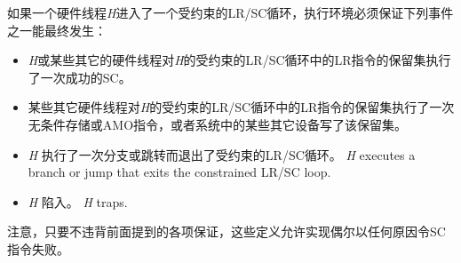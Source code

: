 如果一个硬件线程{\em H}进入了一个受约束的LR/SC循环，执行环境必须保证下列事件之一能最终发生：
\vspace{-0.2in}
\begin{itemize}
\parskip 0pt
\itemsep 1pt
\item {\em H}或某些其它的硬件线程对{\em H}的受约束的LR/SC循环中的LR指令的保留集执行了一次成功的SC。 
\item 某些其它硬件线程对{\em H}的受约束的LR/SC循环中的LR指令的保留集执行了一次无条件存储或AMO指令，或者系统中的某些其它设备写了该保留集。
\item {\em H} 执行了一次分支或跳转而退出了受约束的LR/SC循环。
  {\em H} executes a branch or jump that exits the constrained LR/SC loop.
\item {\em H} 陷入。
  {\em H} traps.
\end{itemize}

\begin{commentary}
  注意，只要不违背前面提到的各项保证，这些定义允许实现偶尔以任何原因令SC指令失败。
\end{commentary}

